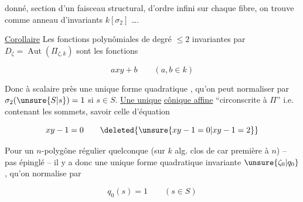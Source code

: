 
donné, section d'un faisceau structural, d'ordre infini sur chaque fibre, on trouve comme anneau d'invariants $k[\sigma_2]$ \dots.

\uline{Corollaire} Les fonctions polynômiales de degré $\leq2$ invariantes par $D_\zeta=\operatorname{Aut}(\Pi_{\zeta,k})$ sont les fonctions

\[axy+b\qquad (a,b\in k)\]

Donc à scalaire près une unique forme quadratique ,  qu'on peut normaliser par $\sigma_2(\unsure{S|s})=1$ si $s\in S$. \uline{Une unique} \uline{cônique affine} ``circonscrite à $\Pi$'' i.e. contenant les sommets, savoir celle d'équation


\[xy-1=0\qquad\deleted{\unsure{xy-1=0|xy-1=2}}\]


Pour un $n$-polygône régulier quelconque (sur $k$ alg. clos de car première à $n$) -- pas épinglé -- il y a donc  une unique forme quadratique invariante $\unsure{\zeta_0|q_0}$, qu'on normalise par

\[q_{0}(s)=1\qquad(s\in S)\]

